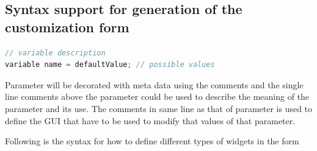 \documentclass[12pt,includeheadfoot,a4paper]{report}
\begin{document}
\subsection{Syntax support for generation of the customization form}

\begin{lstlisting}[language=c++]
// variable description
variable name = defaultValue; // possible values
\end{lstlisting}

Parameter will be decorated with meta data using the comments and the single line comments above the parameter could be used to describe the meaning of the parameter and its use. The comments in same line as that of parameter is used to define the GUI that have to be used to modify that values of that parameter.

Following is the syntax for how to define different types of widgets in the form
\end{document}
